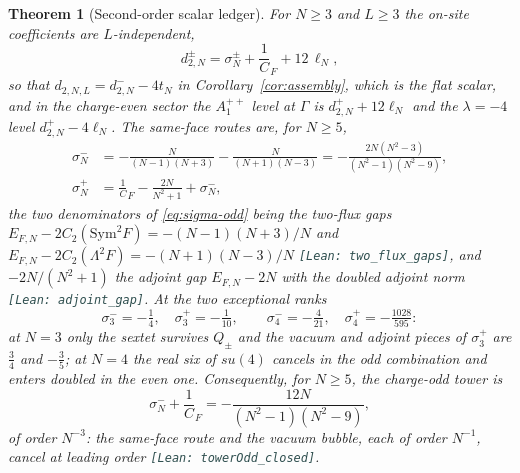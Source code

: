 \documentclass[11pt]{article}
\theoremstyle{plain}
\newtheorem{theorem}{Theorem}
\theoremstyle{definition}
\theoremstyle{remark}
\newcommand{\leanref}[1]{{\footnotesize\textcolor{DarkSlateGray}{\texttt{[Lean: #1]}}}}
\newcommand{\CF}{C_F}
\begin{document}
\begin{theorem}[Second-order scalar ledger]\label{thm:scalar-ledger}
For $N\ge3$ and $L\ge3$ the on-site coefficients are $L$-independent,
\begin{equation}\label{eq:onsite}
 d^\pm_{2,N}=\sigma^\pm_N+\frac1\CF+12\,\ell_N ,
\end{equation}
so that $d_{2,N,L}=d^-_{2,N}-4t_N$ in Corollary~\ref{cor:assembly}, which is
the flat scalar, and in the charge-even sector the $A_1^{++}$ level at
$\Gamma$ is $d^+_{2,N}+12\ell_N$ and the $\lambda=-4$ level $d^+_{2,N}-4\ell_N$.
The same-face routes are, for $N\ge5$,
\begin{align}
 \sigma^-_N&=-\frac{N}{(N-1)(N+3)}-\frac{N}{(N+1)(N-3)}
 =-\frac{2N(N^2-3)}{(N^2-1)(N^2-9)},\label{eq:sigma-odd}\\
 \sigma^+_N&=\frac1\CF-\frac{2N}{N^2+1}+\sigma^-_N,\label{eq:sigma-even}
\end{align}
the two denominators of \eqref{eq:sigma-odd} being the two-flux gaps
$E_{F,N}-2C_2(\mathrm{Sym}^2F)=-(N-1)(N+3)/N$ and
$E_{F,N}-2C_2(\Lambda^2F)=-(N+1)(N-3)/N$ \leanref{two\_flux\_gaps}, and
$-2N/(N^2+1)$ the adjoint gap $E_{F,N}-2N$ with the doubled adjoint norm
\leanref{adjoint\_gap}. At the two exceptional ranks
\[
 \sigma^-_3=-\tfrac14,\quad \sigma^+_3=-\tfrac1{10},\qquad
 \sigma^-_4=-\tfrac4{21},\quad \sigma^+_4=-\tfrac{1028}{595}:
\]
at $N=3$ only the sextet survives $Q_\pm$ and the vacuum and adjoint pieces of
$\sigma^+_3$ are $\tfrac34$ and $-\tfrac35$; at $N=4$ the real six of $su(4)$
cancels in the odd combination and enters doubled in the even one.
Consequently, for $N\ge5$, the charge-odd tower is
\begin{equation}\label{eq:tower}
 \sigma^-_N+\frac1\CF=-\frac{12N}{(N^2-1)(N^2-9)},
\end{equation}
of order $N^{-3}$: the same-face route and the vacuum bubble, each of order
$N^{-1}$, cancel at leading order \leanref{towerOdd\_closed}.
\end{theorem}
\end{document}

